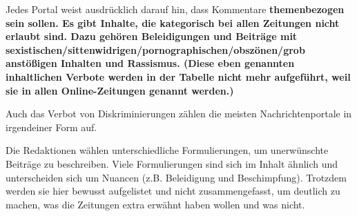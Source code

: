 Jedes Portal weist ausdrücklich darauf hin, dass Kommentare \bf{themenbezogen} sein sollen. 
Es gibt Inhalte, die kategorisch bei allen Zeitungen nicht erlaubt sind. Dazu gehören Beleidigungen und Beiträge mit sexistischen/sittenwidrigen/pornographischen/obszönen/grob anstößigen Inhalten und Rassismus. 
(Diese eben genannten inhaltlichen Verbote werden in der Tabelle nicht mehr aufgeführt, weil sie in allen Online-Zeitungen genannt werden.)

Auch das Verbot von Diskriminierungen zählen die meisten Nachrichtenportale in irgendeiner Form auf. 

Die Redaktionen wählen unterschiedliche Formulierungen, um unerwünschte Beiträge zu beschreiben. Viele Formulierungen sind sich im Inhalt ähnlich  und unterscheiden sich um Nuancen (z.B. Beleidigung und Beschimpfung). Trotzdem werden sie hier bewusst aufgelistet und nicht zusammengefasst, um deutlich zu machen, was die Zeitungen extra erwähnt haben wollen und was nicht. 



